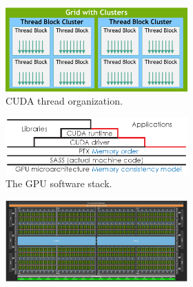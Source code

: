 \documentclass[acmsmall]{acmart}
\begin{document}
\begin{figure}[H]
    \centering
    \begin{subfigure}[b]{0.43\linewidth}
        \centering
        \begin{subfigure}[b]{\linewidth}
            \centering
            \includegraphics[width=\linewidth]{images/threads.png}
            \caption{CUDA thread organization.}
            \label{fig:threads}
        \end{subfigure}
        \vfill
        \begin{subfigure}[b]{\linewidth}
            \centering
            \includegraphics[width=\linewidth]{images/swstack.eps}
            \caption{The GPU software stack.}
            \label{fig:swstack}
        \end{subfigure}
        \vfill
        \begin{subfigure}[b]{\linewidth}
            \centering
            \includegraphics[width=\linewidth]{images/h100.jpg}

\end{subfigure}
\end{subfigure}
\end{figure}
\end{document}
